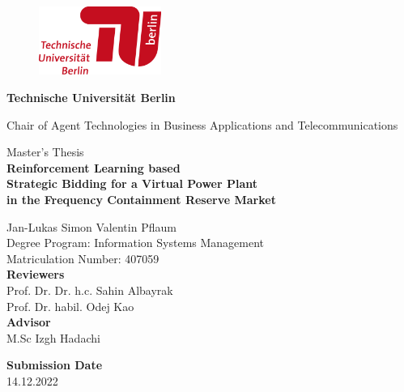 \thispagestyle{empty}
\begin{center}


\begin{figure}[t]
    \centering
    \includegraphics[width=4cm]{./img/tu-logo.png}%
\end{figure}


{\LARGE \textbf{Technische Universit\"at Berlin}}

\vspace{0.3cm}

{\normalsize 
Chair of Agent Technologies in Business Applications and Telecommunications\\[1.6mm]}

\vspace{2.0cm}

{\LARGE Master's Thesis}\\

\vspace{2.5cm}
\Large \textbf{Reinforcement Learning based \\ Strategic Bidding for a Virtual Power Plant \\ in the Frequency Containment Reserve Market}

\vspace{1.0cm}

\normalsize{
Jan-Lukas Simon Valentin Pflaum \\
Degree Program: Information Systems Management\\
Matriculation Number: 407059\\

\vspace*{1.7cm}
\textbf{Reviewers}\\
Prof. Dr. Dr. h.c. Sahin Albayrak\\
Prof. Dr. habil. Odej Kao\\
\vspace*{0.5cm}
\textbf{Advisor}\\
M.Sc Izgh Hadachi\\
\vspace{0.5 cm}

\textbf{Submission Date}\\
14.12.2022\\
}
\end{center}


